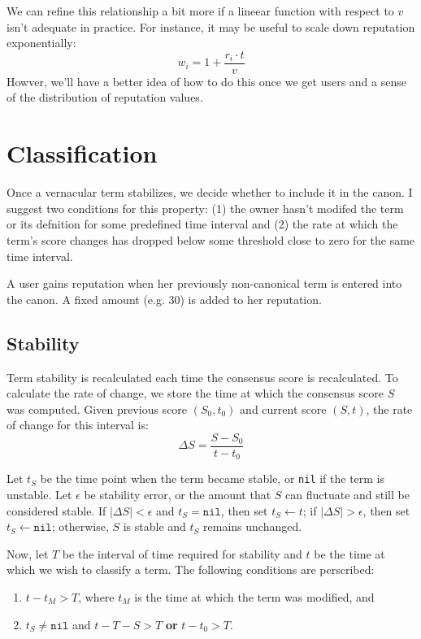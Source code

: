 \documentclass[letter]{article}
\begin{document}
We can refine this relationship a bit more if a lineear function with respect to $v$ isn't adequate
in practice. For instance, it may be useful to scale down reputation exponentially: 
$$ w_i = 1 + \frac{r_i \cdot t}{v} $$
Howver, we'll have a better idea of how to do this once we get users and a sense of the distribution 
of reputation values. 

\section{Classification}
Once a vernacular term stabilizes, we decide whether to include it in the canon. I suggest two 
conditions for this property: (1) the owner hasn't modifed the term or its defnition for some 
predefined time interval and (2) the rate at which the term's score changes has dropped below some
threshold close to zero for the same time interval. 

A user gains reputation when her previously non-canonical term is entered into the canon. A fixed 
amount (e.g. 30) is added to her reputation.

\subsection{Stability}
Term stability is recalculated each time the consensus score is recalculated. 
To calculate the rate of change, we store the time at which the consensus score $S$ was computed. 
Given previous score $(S_0, t_0)$ and current score $(S, t)$, the rate of change for this 
interval is: 
$$ \Delta S = \frac{S - S_0}{t - t_0} $$

Let $t_S$ be the time point when the term became stable, or \texttt{nil} if the term is unstable. 
Let $\epsilon $ be stability error, or the amount that $S$ can fluctuate and still be considered 
stable. If $| \Delta S | < \epsilon $ and $t_S = \texttt{nil}$, then set $t_S \leftarrow t$; 
if $| \Delta S | > \epsilon$, then set $t_S \leftarrow \texttt{nil}$; otherwise, $S$ is 
stable and $t_S$ remains unchanged.

Now, let $T$ be the interval of time required for stability and $t$ be the time at which we 
wish to classify a term. The following conditions are perscribed: 
\begin{enumerate}
\item $t - t_M > T$, where $t_M$ is the time at which the term was modified, and 
\item $t_S \ne \texttt{nil}$ and $t - T-S > T$ \textbf{or} $t - t_0 > T$.
\end{enumerate}
\end{document}
